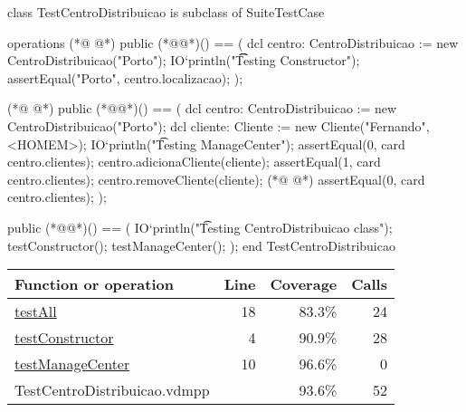 \begin{vdmpp}[breaklines=true]
class TestCentroDistribuicao is subclass of SuiteTestCase

operations
(*@
\label{testConstructor:4}
@*)
  public (*@@*)() == (
    dcl centro: CentroDistribuicao := new CentroDistribuicao("Porto");
    IO`println("\t\t Testing Constructor");
    assertEqual("Porto", centro.localizacao);
  );
 
(*@
\label{testManageCenter:10}
@*)
 public (*@@*)()  == (
  dcl centro: CentroDistribuicao := new CentroDistribuicao("Porto");
  dcl cliente: Cliente := new Cliente("Fernando", <HOMEM>);
  IO`println("\t Testing ManageCenter");  
  assertEqual(0, card centro.clientes);
  centro.adicionaCliente(cliente);
  assertEqual(1, card centro.clientes);
  centro.removeCliente(cliente);
(*@
\label{testAll:18}
@*)
  assertEqual(0, card centro.clientes);
);
 
  public (*@@*)() == (
    IO`println("\t Testing CentroDistribuicao class");
    testConstructor();
    testManageCenter();
  );
end TestCentroDistribuicao
\end{vdmpp}
\bigskip
\begin{longtable}{|l|r|r|r|}
\hline
Function or operation & Line & Coverage & Calls \\
\hline
\hline
\hyperref[testAll:18]{testAll} & 18&83.3\% & 24 \\
\hline
\hyperref[testConstructor:4]{testConstructor} & 4&90.9\% & 28 \\
\hline
\hyperref[testManageCenter:10]{testManageCenter} & 10&96.6\% & 0 \\
\hline
\hline
TestCentroDistribuicao.vdmpp & & 93.6\% & 52 \\
\hline
\end{longtable}

